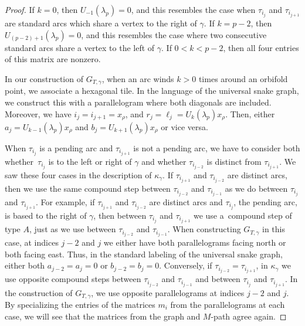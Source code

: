 \documentclass[11pt]{article}
\numberwithin{equation}{section}
\begin{document}
\begin{proof}
If $k = 0$, then $U_{-1}(\lambda_p) = 0$, and this resembles the case when $\tau_{i_j}$ and $\tau_{i_{j+1}}$ are standard arcs which share a vertex to the right of $\gamma$. If $k = p-2$, then $U_{(p-2)+1}(\lambda_p) = 0$, and this resembles the case where two consecutive standard arcs share a vertex to the left of $\gamma$. If $0 < k < p-2$, then all four entries of this matrix are nonzero.

In our construction of $G_{T,\gamma}$, when an arc winds $k > 0$ times around an orbifold point, we associate a hexagonal tile. In the language of the universal snake graph, we construct this with a parallelogram where both diagonals are included. Moreover, we have $i_j = i_{j+1} = x_\rho$, and $r_j = \ell_j = U_k(\lambda_p) x_\rho$. Then, either $a_j = U_{k-1}(\lambda_p) x_\rho$ and $b_j = U_{k+1}(\lambda_p) x_\rho$ or vice versa.

When $\tau_{i_j}$ is a pending arc and $\tau_{i_{j+1}}$ is not a pending arc, we have to consider both whether~$\tau_{i_j}$ is to the left or right of $\gamma$ and whether $\tau_{i_{j-2}}$ is distinct from $\tau_{i_{j+1}}$. We saw these four cases in the description of $\kappa_\gamma$. If $\tau_{i_{j+1}}$ and $\tau_{i_{j-2}}$ are distinct arcs, then we use the same compound step between $\tau_{i_{j-2}}$ and $\tau_{i_{j-1}}$ as we do between $\tau_{i_{j}}$ and $\tau_{i_{j+1}}$. For example, if $\tau_{i_{j+1}}$ and $\tau_{i_{j-2}}$ are distinct arcs and $\tau_{i_j}$, the pending arc, is based to the right of $\gamma$, then between $\tau_{i_j}$ and $\tau_{i_{j+1}}$ we use a~compound step of type $A$, just as we use between $\tau_{i_{j-2}}$ and $\tau_{i_{j-1}}$. When constructing $G_{T,\gamma}$ in this case, at indices $j-2$ and $j$ we either have both parallelograms facing north or both facing east. Thus, in the standard labeling of the universal snake graph, either both $a_{j-2} = a_j = 0$ or $b_{j-2} = b_j = 0$. Conversely, if $\tau_{i_{j-2}} = \tau_{i_{j+1}}$, in $\kappa_\gamma$ we use opposite compound steps between $\tau_{i_{j-2}}$ and $\tau_{i_{j-1}}$ and between $\tau_{i_{j}}$ and $\tau_{i_{j+1}}$. In the construction of $G_{T,\gamma}$, we use opposite parallelograms at indices $j-2$ and $j$. By specializing the entries of the matrices $m_i$ from the parallelograms at each case, we will see that the matrices from the graph and $M$-path agree again.


\end{proof}
\end{document}
